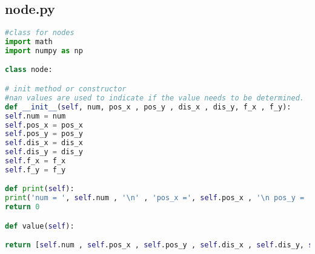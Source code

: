 \subsection*{node.py}
\begin{lstlisting}[language=Python , basicstyle=\linespread{0.75}\listingsfont]
#class for nodes
import math
import numpy as np

class node:

# init method or constructor
#nan values are used to indicate if the value needs to be determined.
def __init__(self, num, pos_x , pos_y , dis_x , dis_y, f_x , f_y):
self.num = num
self.pos_x = pos_x
self.pos_y = pos_y
self.dis_x = dis_x
self.dis_y = dis_y
self.f_x = f_x
self.f_y = f_y

def print(self):
print('num = ', self.num , '\n' , 'pos_x =', self.pos_x , '\n pos_y = ' , self.pos_y , '\n dis_x = ' , self.dis_x , '\n dis_y = ', self.dis_y , '\n f_x = ', self.f_x, '\n f_y = ', self.f_y)
return 0

def value(self):

return [self.num , self.pos_x , self.pos_y , self.dis_x , self.dis_y, self.f_x, self.f_y]
\end{lstlisting}

